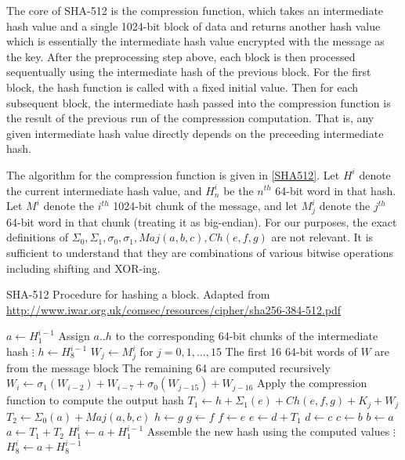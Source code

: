 The core of SHA-512 is the compression function, which takes an intermediate hash value and a single 1024-bit
block of data and returns another hash value which is essentially the intermediate hash value encrypted
with the message as the key. After the preprocessing step above,
each block is then processed sequentually using the
intermediate hash of the previous block.
For the first block, the hash function is called with a fixed initial value. Then for each subsequent
block, the intermediate hash passed into the compression function is the result of the previous run of the
compresssion computation. That is, any given intermediate hash value directly depends on the preceeding
intermediate hash.

The algorithm for the compression function is given in \ref{SHA512}. Let $H^i$ denote the current
intermediate hash value, and $H^i_n$ be the $n^{th}$ 64-bit word in that hash. Let $M^i$ denote the
$i^{th}$ 1024-bit chunk of the message, and let $M^i_j$ denote the $j^{th}$ 64-bit word in that chunk (treating it as big-endian).
For our purposes, the exact definitions of $\Sigma_0, \Sigma_1, \sigma_0, \sigma_1, Maj(a,b,c),
Ch(e,f,g)$ are not relevant. It is sufficient to understand that they are combinations of various bitwise
operations including shifting and XOR-ing.

\begin{algorithm}
  \label{SHA512}
  \caption{SHA-512 Procedure for hashing a block. Adapted from \url{http://www.iwar.org.uk/comsec/resources/cipher/sha256-384-512.pdf}}
  \begin{algorithmic}
    \State $a \leftarrow H^{i-1}_1$
    \Comment Assign $a..h$ to the corresponding 64-bit chunks of the intermediate hash
    \State $\vdots$
    \State $h \leftarrow H^{i-1}_8$
    \State $W_j \leftarrow M_j^i$ for $j=0,1,...,15$
    \Comment The first 16 64-bit words of $W$ are from the message block
    \Comment The remaining 64 are computed recursively
      \State $W_i \leftarrow \sigma_1(W_{i-2}) + W_{i-7} + \sigma_0(W_{j-15}) + W_{j-16}$
    \EndFor
      \Comment Apply the compression function to compute the output hash
      \State $T_1 \leftarrow h + \Sigma_1(e) + Ch(e,f,g) + K_j + W_j$
      \State $T_2 \leftarrow \Sigma_0(a) + Maj(a,b,c)$
      \State $h \leftarrow g$
      \State $g \leftarrow f$
      \State $f \leftarrow e$
      \State $e \leftarrow d + T_1$
      \State $d \leftarrow c$
      \State $c \leftarrow b$
      \State $b \leftarrow a$
      \State $a \leftarrow T_1 + T_2$
    \EndFor
    \State $H_1^i \leftarrow a + H^{i-1}_1$
    \Comment Assemble the new hash using the computed values
    \State $\vdots$
    \State $H_8^i \leftarrow a + H^{i-1}_8$
    \EndProcedure
  \end{algorithmic}
\end{algorithm}

